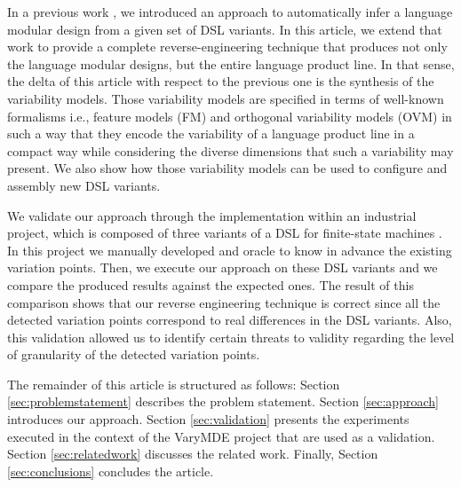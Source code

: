 In a previous work \cite{MendezAcuna:2016}, we introduced an approach to automatically infer a language modular design from a given set of DSL variants. In this article, we extend that work to provide a complete reverse-engineering technique that produces not only the language modular designs, but the entire language product line. In that sense, the delta of this article with respect to the previous one is the synthesis of the variability models. Those variability models are specified in terms of well-known formalisms  i.e., feature models (FM) and orthogonal variability models (OVM) in such a way that they encode the variability of a language product line in a compact way while considering the diverse dimensions that such a variability may present. We also show how those variability models can be used to configure and assembly new DSL variants.

We validate our approach through the implementation within an industrial project, which is composed of three variants of a DSL for finite-state machines \cite{Crane:2007}. In this project we manually developed and oracle to know in advance the existing variation points. Then, we execute our approach on these DSL variants and we compare the produced results against the expected ones. The result of this comparison shows that our reverse engineering technique is correct since all the detected variation points correspond to real differences in the DSL variants. Also, this validation allowed us to identify certain threats to validity regarding the level of granularity of the detected variation points.

The remainder of this article is structured as follows: Section \ref{sec:problemstatement} describes the problem statement. Section \ref{sec:approach} introduces our approach. Section \ref{sec:validation} presents the experiments executed in the context of the VaryMDE project that are used as a validation. Section \ref{sec:relatedwork} discusses the related work. Finally, Section \ref{sec:conclusions} concludes the article.

